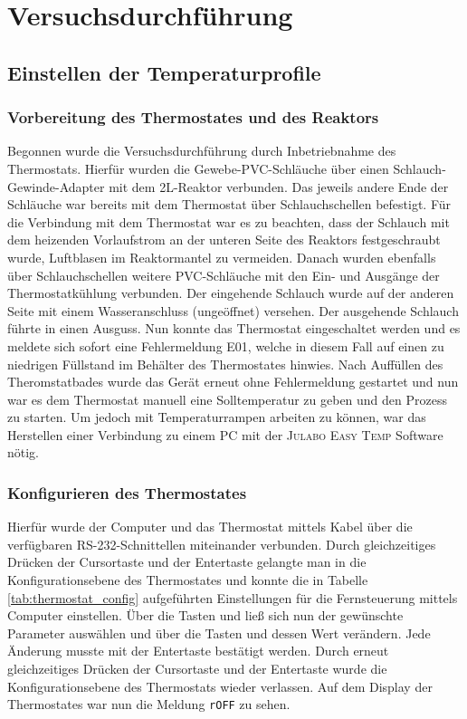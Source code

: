 \section{Versuchsdurchführung}
\label{sec:durchfuerung}

\subsection{Einstellen der Temperaturprofile}
\subsubsection*{Vorbereitung des Thermostates und des Reaktors}
Begonnen wurde die Versuchsdurchführung durch Inbetriebnahme des Thermostats. Hierfür wurden die Gewebe-PVC-Schläuche über einen Schlauch-Gewinde-Adapter mit dem 2L-Reaktor verbunden. Das jeweils andere Ende der Schläuche war bereits mit dem Thermostat über Schlauchschellen befestigt. Für die Verbindung mit dem Thermostat war es zu beachten, dass der Schlauch mit dem heizenden Vorlaufstrom an der unteren Seite des Reaktors festgeschraubt wurde, Luftblasen im Reaktormantel zu vermeiden. Danach wurden ebenfalls über Schlauchschellen weitere PVC-Schläuche mit den Ein- und Ausgänge der Thermostatkühlung verbunden. Der eingehende Schlauch wurde auf der anderen Seite mit einem Wasseranschluss (ungeöffnet) versehen. Der ausgehende Schlauch führte in einen Ausguss. Nun konnte das Thermostat eingeschaltet werden und es meldete sich sofort eine Fehlermeldung E01, welche in diesem Fall auf einen zu niedrigen Füllstand im Behälter des Thermostates hinwies. Nach Auffüllen des Theromstatbades wurde das Gerät erneut ohne Fehlermeldung gestartet und nun war es dem Thermostat manuell eine Solltemperatur zu geben und den Prozess zu starten. Um jedoch mit Temperaturrampen arbeiten zu können, war das Herstellen einer Verbindung zu einem PC mit der \textsc{Julabo Easy Temp} Software nötig.
\subsubsection*{Konfigurieren des Thermostates}
Hierfür wurde der Computer und das Thermostat mittels Kabel über die verfügbaren RS-232-Schnittellen miteinander verbunden. Durch gleichzeitiges Drücken der Cursortaste \keys{\arrowkeyleft} und der Entertaste \keys{\return} gelangte man in die Konfigurationsebene des Thermostates und konnte die in Tabelle \ref{tab:thermostat_config} aufgeführten Einstellungen für die Fernsteuerung mittels Computer einstellen. Über die Tasten \keys{\arrowkeyleft} und \keys{\arrowkeyright} ließ sich nun der gewünschte Parameter auswählen und über die Tasten \keys{\arrowkeyup} und  \keys{\arrowkeydown} dessen Wert verändern. Jede Änderung musste mit der Entertaste \keys{\return} bestätigt werden. Durch erneut gleichzeitiges Drücken der Cursortaste \keys{\arrowkeyleft} und der Entertaste \keys{\return} wurde die Konfigurationsebene des Thermostats wieder verlassen. Auf dem Display der Thermostates war nun die Meldung \texttt{rOFF} zu sehen.
